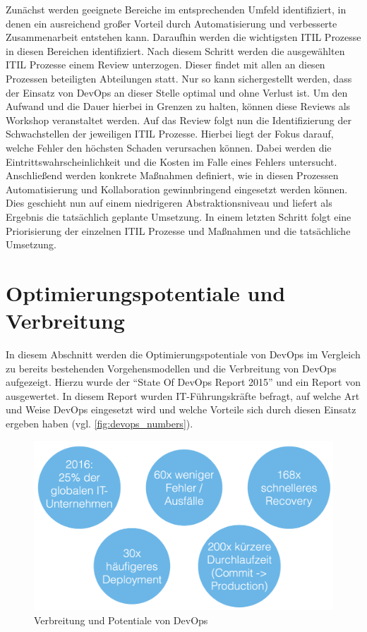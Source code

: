 Zunächst werden geeignete Bereiche im entsprechenden Umfeld identifiziert, in denen ein ausreichend großer Vorteil durch Automatisierung und verbesserte Zusammenarbeit entstehen kann. 
Daraufhin werden die wichtigsten ITIL Prozesse in diesen Bereichen identifiziert. 
Nach diesem Schritt werden die ausgewählten ITIL Prozesse einem Review unterzogen. 
Dieser findet mit allen an diesen Prozessen beteiligten Abteilungen statt. 
Nur so kann sichergestellt werden, dass der Einsatz von DevOps an dieser Stelle optimal und ohne Verlust ist. 
Um den Aufwand und die Dauer hierbei in Grenzen zu halten, können diese Reviews als Workshop veranstaltet werden. 
Auf das Review folgt nun die Identifizierung der Schwachstellen der jeweiligen ITIL Prozesse. 
Hierbei liegt der Fokus darauf, welche Fehler den höchsten Schaden verursachen können. 
Dabei werden die Eintrittswahrscheinlichkeit und die Kosten im Falle eines Fehlers untersucht. 
Anschließend werden konkrete Maßnahmen definiert, wie in diesen Prozessen Automatisierung und Kollaboration gewinnbringend eingesetzt werden können. 
Dies geschieht nun auf einem niedrigeren Abstraktionsniveau und liefert als Ergebnis die tatsächlich geplante Umsetzung. 
In einem letzten Schritt folgt eine Priorisierung der einzelnen ITIL Prozesse und Maßnahmen und die tatsächliche Umsetzung. 
\parencite[Vgl.][]{Sharp-Paul:2016}

\section{Optimierungspotentiale und Verbreitung} \label{sec:optimierung} %
In diesem Abschnitt werden die Optimierungspotentiale von DevOps im Vergleich zu bereits bestehenden Vorgehensmodellen und die Verbreitung von DevOps aufgezeigt. 
Hierzu wurde der \enquote{State Of DevOps Report 2015} \parencite[vgl.][]{DevOpsSODR:2015} und ein Report von \parencite[][]{Gartner:2015} ausgewertet. 
In diesem Report wurden IT-Führungskräfte befragt, auf welche Art und Weise DevOps eingesetzt wird und welche Vorteile sich durch diesen Einsatz ergeben haben (vgl. \autoref{fig:devops_numbers}).

\begin{figure}[ht]
  \centering
  \includegraphics[width=\textwidth]{img/devops_zahlen.png}
  \caption{Verbreitung und Potentiale von DevOps}
  \label{fig:devops_numbers}
\end{figure}


